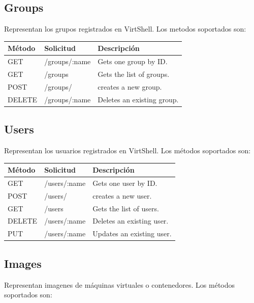\documentclass[conference, spanish]{IEEEtran}
\begin{document}
\subsection{Groups}
Representan los grupos registrados en VirtShell. Los metodos soportados son:

\begin{center}
 \small
 \begin{tabular}{| l | l | l |}
 \hline
  \textbf{Método} & \textbf{Solicitud} & \textbf{Descripción} \\ [0.5ex] 
  \hline\hline
  GET & /groups/:name & Gets one group by ID. \\
  \hline
  GET & /groups & Gets the list of groups. \\  
  \hline
  POST & /groups/ & creates a new group. \\
  \hline
  DELETE & /groups/:name & Deletes an existing group. \\
  \hline
\end{tabular}
\end{center}

\subsection{Users}
Representan los usuarios registrados en VirtShell. Los métodos soportados son:

\begin{center}
 \small
 \begin{tabular}{| l | l | l |}
 \hline
  \textbf{Método} & \textbf{Solicitud} & \textbf{Descripción} \\ [0.5ex] 
  \hline\hline
  GET & /users/:name & Gets one user by ID. \\
  \hline
  POST & /users/ & creates a new user. \\
  \hline
  GET & /users & Gets the list of users. \\  
  \hline
  DELETE & /users/:name & Deletes an existing user. \\
  \hline  
  PUT & /users/:name & Updates an existing user. \\ [1ex]  
  \hline
\end{tabular}
\end{center}

\subsection{Images}
Representan imagenes de máquinas virtuales o contenedores. Los métodos soportados son:
\end{document}
